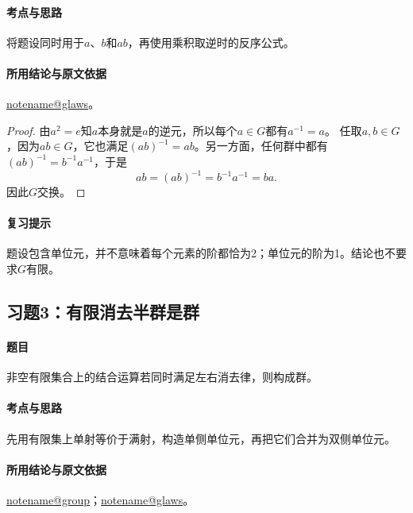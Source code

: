 \documentclass[UTF8,a4paper,11pt,fontset=windows]{ctexart}
\makeatletter
\newcommand{\noteref}[1]{\hyperref[note:#1]{\csname notename@#1\endcsname}}
\newcommand{\exref}[2]{\hyperref[ex:#1:#2]{第#1章习题#2}}
\makeatother
\begin{document}
\paragraph{考点与思路}
将题设同时用于$a$、$b$和$ab$，再使用乘积取逆时的反序公式。

\paragraph{所用结论与原文依据}
\noteref{glaws}。


\begin{proof}
由$a^2=e$知$a$本身就是$a$的逆元，所以每个$a\in G$都有$a^{-1}=a$。
任取$a,b\in G$，因为$ab\in G$，它也满足$(ab)^{-1}=ab$。另一方面，任何群中都有$(ab)^{-1}=b^{-1}a^{-1}$，于是
\[
ab=(ab)^{-1}=b^{-1}a^{-1}=ba.
\]
因此$G$交换。
\end{proof}

\paragraph{复习提示}
题设包含单位元，并不意味着每个元素的阶都恰为2；单位元的阶为1。结论也不要求$G$有限。


\subsection{习题3：\texorpdfstring{有限消去半群是群}{有限消去半群是群}}
\label{ex:1:3}

\paragraph{题目}
非空有限集合上的结合运算若同时满足左右消去律，则构成群。

\paragraph{考点与思路}
先用有限集上单射等价于满射，构造单侧单位元，再把它们合并为双侧单位元。

\paragraph{所用结论与原文依据}
\noteref{group}；\noteref{glaws}。

\end{document}
